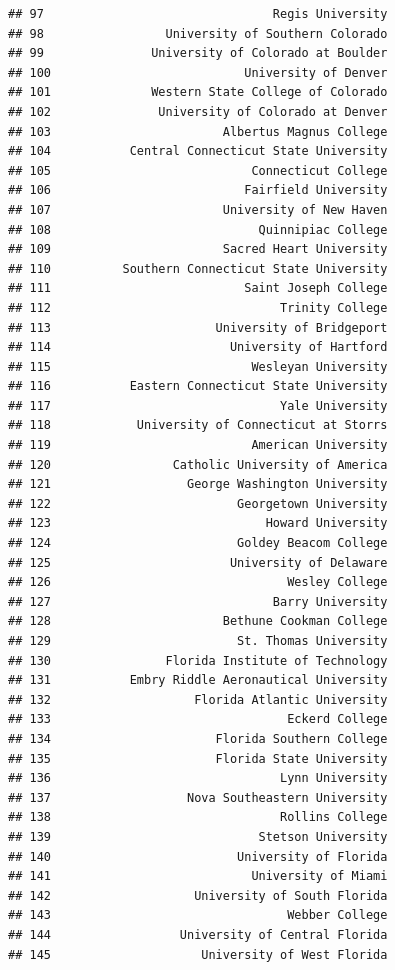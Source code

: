 \documentclass[]{article}
\begin{document}
\begin{verbatim}
## 97                                Regis University
## 98                 University of Southern Colorado
## 99               University of Colorado at Boulder
## 100                           University of Denver
## 101              Western State College of Colorado
## 102               University of Colorado at Denver
## 103                        Albertus Magnus College
## 104           Central Connecticut State University
## 105                            Connecticut College
## 106                           Fairfield University
## 107                        University of New Haven
## 108                             Quinnipiac College
## 109                        Sacred Heart University
## 110          Southern Connecticut State University
## 111                           Saint Joseph College
## 112                                Trinity College
## 113                       University of Bridgeport
## 114                         University of Hartford
## 115                            Wesleyan University
## 116           Eastern Connecticut State University
## 117                                Yale University
## 118            University of Connecticut at Storrs
## 119                            American University
## 120                 Catholic University of America
## 121                   George Washington University
## 122                          Georgetown University
## 123                              Howard University
## 124                          Goldey Beacom College
## 125                         University of Delaware
## 126                                 Wesley College
## 127                               Barry University
## 128                        Bethune Cookman College
## 129                          St. Thomas University
## 130                Florida Institute of Technology
## 131           Embry Riddle Aeronautical University
## 132                    Florida Atlantic University
## 133                                 Eckerd College
## 134                       Florida Southern College
## 135                       Florida State University
## 136                                Lynn University
## 137                   Nova Southeastern University
## 138                                Rollins College
## 139                             Stetson University
## 140                          University of Florida
## 141                            University of Miami
## 142                    University of South Florida
## 143                                 Webber College
## 144                  University of Central Florida
## 145                     University of West Florida

\end{verbatim}
\end{document}
